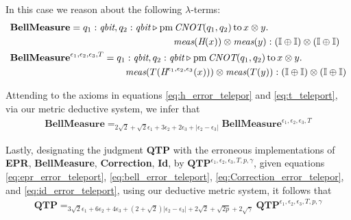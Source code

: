 \begin{example}
    In this case we reason about the following $\lambda$-terms:
    \begin{align*}
      &\textbf{BellMeasure} =  q_{1}: \textit{qbit}, q_{2}: \textit{qbit}
   \vljud  \text{pm} \, \textit{CNOT} (q_{1},q_{2})
  \,  \text{to}\, x \otimes y. \,
    \\ 
   & \hspace{170pt} \textit{meas} (\textit{H} (x)) \otimes \textit{meas} (y) : \left(\typeI\oplus \typeI\right) \otimes \left(\typeI\oplus
   \typeI\right) \\
      & \textbf{BellMeasure}^{\epsilon_1, \epsilon_2,\epsilon_3,T} =  q_{1}: \textit{qbit}, q_{2}: \textit{qbit}
      \vljud  \text{pm} \, \textit{CNOT} (q_{1},q_{2})
     \,  \text{to}\, x \otimes y. \,
     \\
      &  \hspace{120pt} \textit{meas} (T(\textit{H}^{\epsilon_1, \epsilon_2,\epsilon_3} (x))) \otimes \textit{meas} ( T(y)):\left(\typeI\oplus \typeI\right) \otimes \left(\typeI\oplus
      \typeI\right) \\
    \end{align*}
  
  Attending to the axioms in equations \eqref{eq:h_error_telepor} and \eqref{eq:t_teleport}, via our metric deductive system, we infer that
  \begin{align} \label{eq:bell_error_teleport}
    \textbf{BellMeasure} =_{2 \sqrt{2} + \sqrt{2}\epsilon_1 + 3\epsilon_2 + 2\epsilon_3 + |\epsilon_2-\epsilon_3|} \textbf{BellMeasure}^{\epsilon_1, \epsilon_2,\epsilon_3,T}
  \end{align}

  Lastly, designating the judgment \textbf{QTP} with the erroneous implementations of \textbf{EPR}, \textbf{BellMeasure}, \textbf{Correction}, \textbf{Id}, by $\textbf{QTP}^{\epsilon_1, \epsilon_2,\epsilon_3,T,p,\gamma}$, given equations \eqref{eq:epr_error_teleport}, \eqref{eq:bell_error_teleport}, \eqref{eq:Correction_error_telepor}, and  \eqref{eq:id_error_teleport}, using our deductive metric system, it follows that
  \begin{align*}
    \textbf{QTP} =_{ 3\sqrt{2}\epsilon_1 + 6\epsilon_2 + 4\epsilon_3 + (2+\sqrt{2})|\epsilon_2-\epsilon_3| + 2 \sqrt{2} + \sqrt{2p}  +2\sqrt{\gamma}} \textbf{QTP}^{\epsilon_1, \epsilon_2,\epsilon_3,T,p,\gamma}
  \end{align*}

\end{example}


